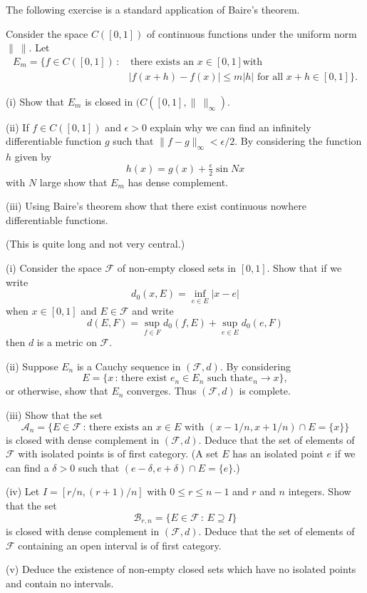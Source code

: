 The following exercise is a standard application of
Baire's theorem.
\begin{exercise} Consider the space $C([0,1])$
of continuous functions under the uniform norm
$\|\ \|$. Let
\begin{align*}
E_{m}=\{f\in C([0,1])\,:&\, \text{there exists an $x\in [0,1]$
with}\\
&\text{$|f(x+h)-f(x)|\leq m|h|$ for all $x+h\in[0,1]$}\}.
\end{align*}

(i) Show that $E_{m}$ is closed in $(C([0,1],\|\ \|_{\infty})$.

(ii) If $f\in C([0,1])$ and $\epsilon>0$ explain why we can
find an infinitely differentiable function $g$ such that
$\|f-g\|_{\infty}<\epsilon/2$. By considering the function $h$
given by
\[h(x)=g(x)+\tfrac{\epsilon}{2}\sin Nx\]
with $N$ large show that $E_{m}$ has dense complement.

(iii) Using Baire's theorem show that there exist continuous
nowhere differentiable functions.
\end{exercise}
\begin{exercise} (This is quite long and not very
central.)

(i) Consider the space ${\mathcal F}$ of non-empty
closed sets in $[0,1]$. Show that if we write
\[d_{0}(x,E)=\inf_{e\in E}|x-e|\]
when $x\in[0,1]$ and $E\in{\mathcal F}$
and write
\[d(E,F)=\sup_{f\in F}d_{0}(f,E)+\sup_{e\in E}d_{0}(e,F)\]
then $d$ is a metric on ${\mathcal F}$.

(ii) Suppose $E_{n}$ is a Cauchy sequence in 
$({\mathcal F},d)$. By considering
\[E=\{x\,:\,\text{there exist $e_{n}\in E_{n}$ such that
$e_{n}\rightarrow x$}\},\]
or otherwise, show that $E_{n}$ converges.
Thus $({\mathcal F},d)$ is complete.

(iii) Show that the set
\[\mathcal{A}_{n}=\{E\in{\mathcal F}\,:\,\text{there exists
an $x\in E$ with $(x-1/n,x+1/n)\cap E=\{x\}$}\}\]
is closed with dense complement in $({\mathcal F},d)$.
Deduce that the set of elements of ${\mathcal F}$ with
isolated points is of first category. (A set $E$ has
an isolated point $e$ if we can find a $\delta>0$
such that $(e-\delta,e+\delta)\cap E=\{e\}$.)

(iv) Let $I=[r/n,(r+1)/n]$ with $0\leq r\leq n-1$ and
$r$ and $n$ integers. Show that the set
\[\mathcal{B}_{r,n}=
\{E\in{\mathcal F}\,:\,E\supseteq I\}\]
is closed with dense complement in $({\mathcal F},d)$.
Deduce that the set of elements of ${\mathcal F}$
containing an open interval is of first category.

(v) Deduce the existence of non-empty closed sets
which have no isolated points and contain no intervals.
\end{exercise} 
